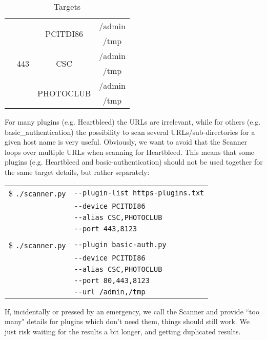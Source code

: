 \begin{table}
\begin{center}
\begin{tabular}{ | c | c | c | c |}
    & \multirow{6}{*}{443} &     \multirow{2}{*}{PCITDI86} & /admin
   \\
    \cline{4-4}
       &     &     & /tmp
    \\
     \cline{3-4}
	& & \multirow{2}{*}{CSC} & /admin
	\\
	 \cline{4-4}
       &     &     & /tmp
    \\
     \cline{3-4}
 	& & \multirow{2}{*}{PHOTOCLUB} & /admin
	\\
	 \cline{4-4}
       &     &     & /tmp

	
        \\ \hline
    \end{tabular}
    \caption{Targets}
    \label{table:targets}
   \end{center}
\end{table}

For many plugins (e.g. Heartbleed) the URLs are irrelevant, while for others (e.g. basic\_authentication) the possibility to scan several URLs/sub-directories for a given host name is very useful. Obviously, we want to avoid that the Scanner loops over multiple URLs when scanning for Heartbleed. This means that some plugins (e.g. Heartbleed and basic-authentication) should not be used together for the same target details, but rather separately: 

\begin{table}[H]
    \begin{tabular}{ c  l }


\$ \texttt{./scanner.py} & \texttt{-{}-plugin-list https-plugins.txt} \\
  & \texttt{-{}-device PCITDI86} \\
  & \texttt{-{}-alias CSC,PHOTOCLUB}\\
  & \texttt{-{}-port 443,8123}\\
  \\
  
    	       \$ \texttt{./scanner.py} & \texttt{-{}-plugin basic-auth.py} \\
  & \texttt{-{}-device PCITDI86} \\
  & \texttt{-{}-alias CSC,PHOTOCLUB}\\
  & \texttt{-{}-port 80,443,8123}\\
    	       & \texttt{-{}-url /admin,/tmp}
    	       
	\end{tabular}
    
\end{table}
\noindent
If, incidentally or pressed by an emergency, we call the Scanner and provide ``too many" details for plugins which don't need them, things should still work. We just risk waiting for the results a bit longer, and getting duplicated results.
